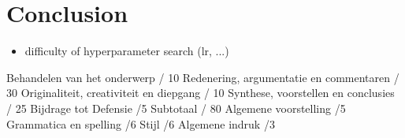 \chapter{Conclusion}
\begin{itemize}
    \item difficulty of hyperparameter search (lr, ...)
\end{itemize}

Behandelen van het onderwerp / 10
Redenering, argumentatie en commentaren / 30
Originaliteit, creativiteit en diepgang / 10
Synthese, voorstellen en conclusies / 25
Bijdrage tot Defensie /5
Subtotaal / 80
Algemene voorstelling /5
Grammatica en spelling /6
Stijl /6
Algemene indruk /3

\label{ch:conclusion}